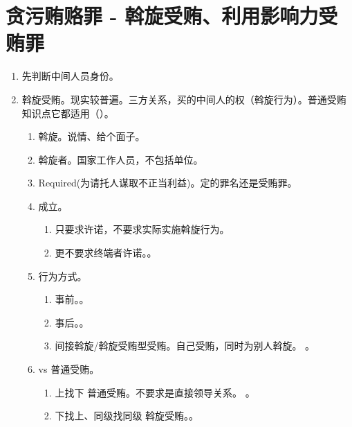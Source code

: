 \section{贪污贿赂罪 - 斡旋受贿、利用影响力受贿罪}
\begin{enumerate}
  \item 先判断中间人员身份。
  \item 斡旋受贿。现实较普遍。三方关系，买的中间人的权（斡旋行为）。普通受贿知识点它都适用（）。
        \begin{enumerate}
          \item 斡旋。说情、给个面子。
          \item 斡旋者。国家工作人员，不包括单位。
          \item Required(为请托人谋取不正当利益)。定的罪名还是受贿罪。
          \item 成立。
                \begin{enumerate}
                  \item 只要求许诺，不要求实际实施斡旋行为。
                  \item 更不要求终端者许诺。。
                \end{enumerate}
          \item 行为方式。
                \begin{enumerate}
                  \item 事前。。
                  \item 事后。。
                  \item 间接斡旋/斡旋受贿型受贿。自己受贿，同时为别人斡旋。
                        。
                \end{enumerate}
          \item vs 普通受贿。
                \begin{enumerate}
                  \item 上找下 \yjt 普通受贿。不要求是直接领导关系。
                        。
                  \item 下找上、同级找同级 \yjt 斡旋受贿。。
                \end{enumerate}

\end{enumerate}
\end{enumerate}
